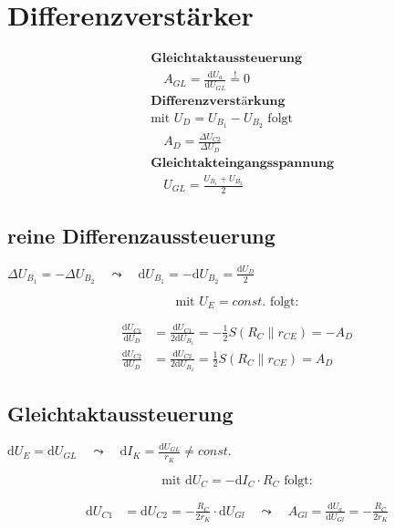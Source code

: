 \newpage
\section*{Differenzverstärker}

\begin{multicols}{2}

	\begin{center}
		
	\end{center}

	\begin{align*}
		&\textbf{Gleichtaktaussteuerung}
		\\
		&\quad A_{GL} = \frac{\mathrm{d} U_a}{\mathrm{d} U_{GL}} \stackrel{!}{=} 0
		\\
		&\textbf{Differenzverstärkung}
		\\
		&\text{mit } U_D = U_{B_1} - U_{B_2} \text{ folgt}
		\\
		&\quad A_D = \frac{\Delta U_{C2}}{\Delta U_D}
		\\
		&\textbf{Gleichtakteingangsspannung}
		\\
		&\quad U_{GL} = \frac{U_{B_1} + U_{B_2}}{2}
	\end{align*}

\end{multicols}

\subsection*{reine Differenzaussteuerung}
\( 
\Delta U_{B_1} = -\Delta U_{B_2} \quad \leadsto \quad \mathrm{d} U_{B_1} = -\mathrm{d} U_{B_2} =
\frac{\mathrm{d}U_D}{2}
\)

\[
\text{mit } U_E = const. \text{ folgt:}
\]

\begin{align*}
	\frac{\mathrm{d} U_{C1}}{\mathrm{d} U_D} &= \frac{\mathrm{d} U_{C1}}{2 \mathrm{d} U_{B_1}} =
	-\frac{1}{2} S \left( R_C \parallel r_{CE} \right) = -A_D
	\\
	\frac{\mathrm{d} U_{C2}}{\mathrm{d} U_D} &= \frac{\mathrm{d} U_{C2}}{2 \mathrm{d} U_{B_2}} =
	\frac{1}{2} S \left( R_C \parallel r_{CE} \right) = A_D
\end{align*}

\newpage
\subsection*{Gleichtaktaussteuerung}
\(
\mathrm{d} U_E = \mathrm{d} U_{GL} \quad \leadsto \quad \mathrm{d} I_K = \frac{\mathrm{d}
U_{GL}}{r_K} \neq const.
\)

\[
\text{mit } \mathrm{d}U_C = -\mathrm{d}I_C \cdot R_C \text{ folgt:}
\]

\begin{align*}
\mathrm{d}U_{C1} &= \mathrm{d}U_{C2} = -\frac{R_C}{2 r_K} \cdot \mathrm{d}U_{Gl} \quad \leadsto
\quad A_{Gl} =
\frac{\mathrm{d}U_a}{\mathrm{d}U_{Gl}} = -\frac{R_C}{2 r_K}
\end{align*}



